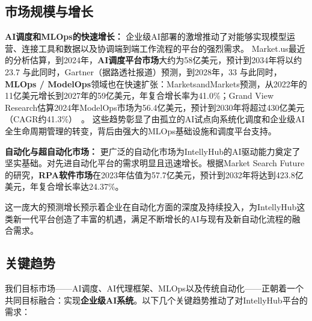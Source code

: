 \documentclass[11点, A4纸, 单面]{article}
\begin{document}
\subsection{市场规模与增长}
\textbf{AI调度和MLOps的快速增长：} 企业级AI部署的激增推动了对能够实现模型运营、连接工具和数据以及协调端到端工作流程的平台的强烈需求。  
Market.us最近的分析估算，到2024年，\textbf{AI调度平台市场}大约为58亿美元，预计到2034年将以约23.7%
与此同时，Gartner（据路透社报道）预测，到2028年，33%
与此同时，\textbf{MLOps / ModelOps}领域也在快速扩张：MarketsandMarkets预测，从2022年的11亿美元增长到2027年的59亿美元，年复合增长率为41.0\%\cite{MLOpsMM}；Grand View Research估算2024年ModelOps市场为56.4亿美元，预计到2030年将超过430亿美元（CAGR约41.3\%）~\cite{ModelOpsGV}。  
这些趋势彰显了由孤立的AI试点向系统化调度和企业级AI全生命周期管理的转变，背后由强大的MLOps基础设施和调度平台支持。\newline\newline

\textbf{自动化与超自动化市场：} 更广泛的自动化市场为IntellyHub的AI驱动能力奠定了坚实基础。对先进自动化平台的需求明显且迅速增长。根据Market Search Future的研究，\textbf{RPA软件市场}在2023年估值为57.7亿美元，预计到2032年将达到423.8亿美元，年复合增长率达24.37\%\cite{mrfRPA}。

这一庞大的预测增长预示着企业在自动化方面的深度及持续投入，为IntellyHub这类新一代平台创造了丰富的机遇，满足不断增长的AI与现有及新自动化流程的融合需求。

\subsection{关键趋势}
我们目标市场——AI调度、AI代理框架、MLOps以及传统自动化——正朝着一个共同目标融合：实现\textbf{企业级AI系统}。以下几个关键趋势推动了对IntellyHub平台的需求：
\end{document}
